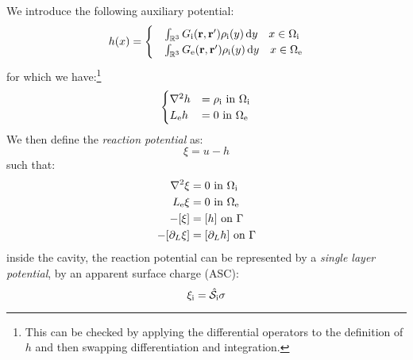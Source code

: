 We introduce the following auxiliary potential:
\begin{equation}
  h(x) =
  \begin{cases}
    &\int_{\mathbb{R}^3}G_\mathrm{i}(\mathbf{r}, \mathbf{r}^\prime)\rho_\mathrm{i}(y)\mathop{}\!\mathrm{d} y  \quad x \in \Omega_\mathrm{i} \\
    &\int_{\mathbb{R}^3}G_\mathrm{e}(\mathbf{r}, \mathbf{r}^\prime)\rho_\mathrm{i}(y)\mathop{}\!\mathrm{d} y  \quad x \in \Omega_\mathrm{e}
  \end{cases}
\end{equation}
for which we have:\footnote{This can be checked by applying the
differential operators to the definition of $h$ and then swapping
differentiation and integration.}
\begin{equation}
  \begin{cases}
    \nabla^2 h &= \rho_\mathrm{i} \,\, \text{in}\,\, \Omega_\mathrm{i} \\
    L_\mathrm{e} h &= 0 \,\, \text{in}\,\, \Omega_\mathrm{e}
  \end{cases}
\end{equation}
We then define the \emph{reaction potential} as:
\begin{equation}
  \xi = u - h
\end{equation}
such that:
\begin{subequations}
\begin{align}
  \nabla^2 \xi &= 0 \,\, \text{in}\,\, \Omega_\mathrm{i} \\
  L_\mathrm{e} \xi &= 0 \,\, \text{in}\,\, \Omega_\mathrm{e} \\
  -[\xi] &= [h] \,\, \text{on}\,\, \Gamma \\
  -[\partial_L \xi] &= [\partial_L h] \,\, \text{on}\,\, \Gamma
\end{align}
\end{subequations}
inside the cavity, the reaction potential can be represented by a
\emph{single layer potential}, \ie by an apparent surface charge (ASC):
\begin{equation}
  \xi_\mathrm{i} = \hat{\mathcal{S}}_\mathrm{i}\sigma
\end{equation}

